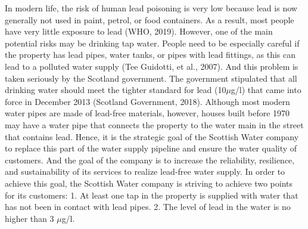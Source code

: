 \documentclass[11pt,twoside]{article}
\numberwithin{Theorem}{section}
\numberwithin{Definition}{section}
\numberwithin{Lemma}{section}
\numberwithin{Algorithm}{section}
\numberwithin{equation}{section}
\begin{document}
In modern life, the risk of human lead poisoning is very low because lead is now generally not used in paint, petrol, or food containers. As a result, most people have very little exposure to lead (WHO, 2019). However, one of the main potential risks may be drinking tap water. People need to be especially careful if the property has lead pipes, water tanks, or pipes with lead fittings, as this can lead to a polluted water supply (Tee Guidotti, et al., 2007). And this problem is taken seriously by the Scotland government. The government stipulated that all drinking water should meet the tighter standard for lead (10$\mu$g/l) that came into force in December 2013 (Scotland Government, 2018). Although most modern water pipes are made of lead-free materials, however, houses built before 1970 may have a water pipe that connects the property to the water main in the street that contains lead. Hence, it is the strategic goal of the Scottish Water company to replace this part of the water supply pipeline and ensure the water quality of customers. And the goal of the company is to increase the reliability, resilience, and sustainability of its services to realize lead-free water supply. In order to achieve this goal, the Scottish Water company is striving to achieve two points for its customers: 1. At least one tap in the property is supplied with water that has not been in contact with lead pipes. 2. The level of lead in the water is no higher than 3 $\mu$g/l.

\clearpage
\end{document}
